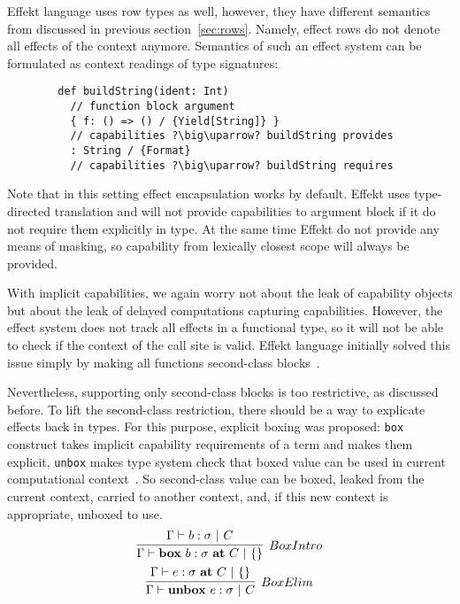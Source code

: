 \documentclass[conference]{IEEEtran}
\newcommand{\ap}{~}
\begin{document}
    Effekt language uses row types as well, however, they have different semantics from discussed in previous section~\ref{sec:rows}.
    Namely, effect rows do not denote all effects of the context anymore.
    Semantics of such an effect system can be formulated as context readings of type signatures:
    \begin{verbatim}
        def buildString(ident: Int)
          // function block argument
          { f: () => () / {Yield[String]} }
          // capabilities ?\big\uparrow? buildString provides
          : String / {Format}
          // capabilities ?\big\uparrow? buildString requires
    \end{verbatim}

    Note that in this setting effect encapsulation works by default.
    Effekt uses type-directed translation and will not provide capabilities to argument block if it do not require them explicitly in type.
    At the same time Effekt do not provide any means of masking, so capability from lexically closest scope will always be provided.


    With implicit capabilities, we again worry not about the leak of capability objects but about the leak of delayed computations capturing capabilities.
    However, the effect system does not track all effects in a functional type, so it will not be able to check if the context of the call site is valid.
    Effekt language initially solved this issue simply by making all functions second-class blocks~\cite{brachthauser2020effects}.

    Nevertheless, supporting only second-class blocks is too restrictive, as discussed before.
    To lift the second-class restriction, there should be a way to explicate effects back in types.
    For this purpose, explicit boxing was proposed:
    \texttt{box} construct takes implicit capability requirements of a term and makes them explicit,
    \texttt{unbox} makes type system check that boxed value can be used in current computational context~\cite{hannan1998type, brachthauser2022effects}.
    So second-class value can be boxed, leaked from the current context, carried to another context, and, if this new context is appropriate, unboxed to use.
    \begin{gather*}
        \infer[BoxIntro]{\Gamma \vdash \mathbf{box}\ap b : \sigma~ \mathbf{at}\ap C ~|~ \{\}}{\Gamma \vdash b : \sigma ~|~ C}
        \\
        \infer[BoxElim]{\Gamma \vdash \mathbf{unbox}\ap e : \sigma ~|~ C}{\Gamma \vdash e : \sigma ~\mathbf{at}~C ~|~ \{\}}
    \end{gather*}
\end{document}
